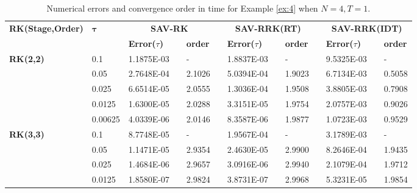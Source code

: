 	
\begin{table}[H]\footnotesize
	\centering
	\caption{Numerical errors and convergence order in time for Example \ref{ex:4} when $N=4, T = 1$.}
	\begin{tabular}{lllllrlrlrlrlrl}
	\toprule
	\multicolumn{2}{l}{\multirow{2}[3]{*}{\textbf{RK(Stage,Order)}}} & \multicolumn{2}{l}{\multirow{2}[3]{*}{$\bm{\tau}$}} & \multicolumn{3}{c}{\textbf{SAV-RK}} &       & \multicolumn{3}{c}{\textbf{SAV-RRK(RT)}} &       & \multicolumn{3}{c}{\textbf{SAV-RRK(IDT)}} \\
	\cmidrule{5-7}\cmidrule{9-11}\cmidrule{13-15}    \multicolumn{2}{l}{} & \multicolumn{2}{l}{} & \textbf{Error($\tau$)} &       & \textbf{order} &       & \textbf{Error($\tau$)} &       & \textbf{order} &       & \textbf{Error($\tau$)} &       & \textbf{order} \\
	\hline
	\multicolumn{2}{l}{\multirow{5}[0]{*}{\textbf{RK(2,2)}}} & \multicolumn{2}{l}{0.1} & 1.1875E-03 &       & -     &       & 1.8837E-03 &       & -     &       & 9.5325E-03 &       & - \\
	\multicolumn{2}{l}{} & \multicolumn{2}{l}{0.05} & 2.7648E-04 &       & 2.1026  &       & 5.0394E-04 &       & 1.9023  &       & 6.7134E-03 &       & 0.5058  \\
	\multicolumn{2}{l}{} & \multicolumn{2}{l}{0.025} & 6.6514E-05 &       & 2.0555  &       & 1.3036E-04 &       & 1.9508  &       & 3.8805E-03 &       & 0.7908  \\
	\multicolumn{2}{l}{} & \multicolumn{2}{l}{0.0125} & 1.6300E-05 &       & 2.0288  &       & 3.3151E-05 &       & 1.9754  &       & 2.0757E-03 &       & 0.9026  \\
	\multicolumn{2}{l}{} & \multicolumn{2}{l}{0.00625} & 4.0339E-06 &       & 2.0146  &       & 8.3587E-06 &       & 1.9877  &       & 1.0723E-03 &       & 0.9529  \\
	\multicolumn{2}{l}{\multirow{5}[0]{*}{\textbf{RK(3,3)}}} & \multicolumn{2}{l}{0.1} & 8.7748E-05 &       & -     &       & 1.9567E-04 &       & -     &       & 3.1789E-03 &       & - \\
	\multicolumn{2}{l}{} & \multicolumn{2}{l}{0.05} & 1.1471E-05 &       & 2.9354  &       & 2.4630E-05 &       & 2.9900  &       & 8.2646E-04 &       & 1.9435  \\
	\multicolumn{2}{l}{} & \multicolumn{2}{l}{0.025} & 1.4684E-06 &       & 2.9657  &       & 3.0916E-06 &       & 2.9940  &       & 2.1079E-04 &       & 1.9712  \\
	\multicolumn{2}{l}{} & \multicolumn{2}{l}{0.0125} & 1.8580E-07 &       & 2.9824  &       & 3.8731E-07 &       & 2.9968  &       & 5.3231E-05 &       & 1.9854  \\

\end{tabular}
\end{table}
